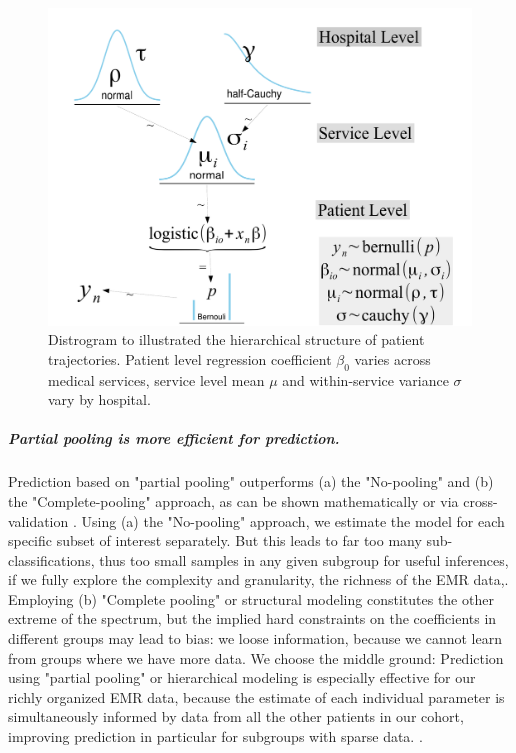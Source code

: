 \documentclass[11pt,notitlepage]{article}
\begin{document}
\begin{figure} %
 \vspace{-15pt}
 \includegraphics[scale=0.3]{Figures/Distrogram.pdf} 
  \vspace{-10pt}
 \caption{\footnotesize Distrogram to illustrated the hierarchical structure of patient trajectories. Patient level regression coefficient $\beta_0$ varies across medical services, service level mean $\mu$ and within-service variance $\sigma$ vary by hospital. }
 \vspace{-10pt}
 \label{fig:Distrogram}
\end{figure} 

\subparagraph*{Partial pooling is more efficient for prediction.}
Prediction based on "partial pooling" outperforms (a) the "No-pooling" and (b) the "Complete-pooling" approach, as can be shown mathematically or via cross-validation \cite{Gelman-Hill_2014}. Using (a) the "No-pooling" approach, we estimate the model for each specific subset of interest separately. But this leads to far too many sub-classifications, thus too small samples in any given subgroup for useful inferences, if we fully explore the complexity and granularity, the richness of the EMR data,. Employing (b) "Complete pooling" or structural modeling constitutes the other extreme of the spectrum, but the implied hard constraints on the coefficients in different groups may lead to bias: we loose information, because we cannot learn from groups where we have more data. We choose the middle ground: Prediction using "partial pooling" or hierarchical modeling is especially effective for our richly organized EMR data, because the estimate of each individual parameter is simultaneously informed by data from all the other patients in our cohort, improving prediction in particular for subgroups with sparse data. \cite{Gelman_multilevel_2006}. 
\vspace{3pt}
\end{document}
